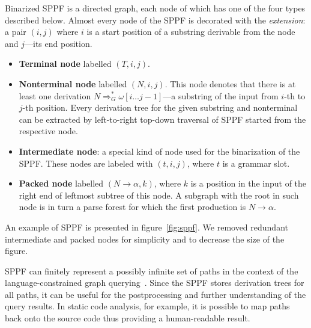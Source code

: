 Binarized SPPF is a directed graph, each node of which has one of the four types described below.
Almost every node of the SPPF is decorated with the \emph{extension}: a pair $(i, j)$ where $i$ is a start position of a substring derivable from the node and $j$---its end position.


\begin{itemize}
    \item \textbf{Terminal node} labelled $(T, i, j)$.
    \item \textbf{Nonterminal node} labelled $(N, i, j)$.
    This node denotes that there is at least one derivation $N \Rightarrow^*_G \omega[i \dots j-1]$---a substring of the input from $i$-th to $j$-th position.
    Every derivation tree for the given substring and nonterminal can be extracted by left-to-right top-down traversal of SPPF started from the respective node.
    \item \textbf{Intermediate node}: a special kind of node used for the binarization of the SPPF. These nodes are labeled with $(t,i,j)$, where $t$ is a grammar slot.
    \item \textbf{Packed node} labelled $(N \rightarrow \alpha, k)$, where $k$ is a position in the input of the right end of leftmost subtree of this node.
    A subgraph with the root in such node is in turn a parse forest for which the first production is $N \rightarrow \alpha$.

\end{itemize}


An example of SPPF is presented in figure~\ref{fig:sppf}.
We removed redundant intermediate and packed nodes for simplicity and to decrease the size of the figure.

SPPF can finitely represent a possibly infinite set of paths in the context of the language-constrained graph querying~\cite{GrigorevR16}.
Since the SPPF stores derivation trees for all paths, it can be useful for the postprocessing and further understanding of the query results.
In static code analysis, for example, it is possible to map paths back onto the source code thus providing a human-readable result.


